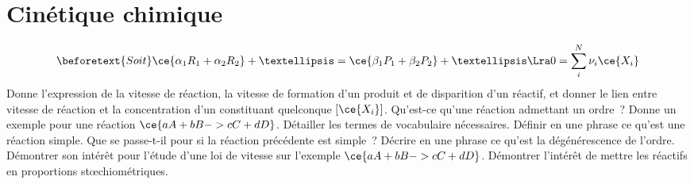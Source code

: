 \documentclass[a4paper, 10pt, final, garamond]{book}
\begin{document}
\setcounter{chapter}{7}

\chapter{Cinétique chimique }

\begin{enumerate}[label=\sqenumi, leftmargin=10pt]
	\leavevmode\vspace*{-\dimexpr\baselineskip+\abovedisplayskip\relax-10pt}
	\begin{gather*}
		\beforetext{Soit}
		\ce{\alpha_1R_1 + \alpha_2R_2} +…
		=
		\ce{\beta_1P_1 +\beta_2P_2}+…
		\Lra
		0 = \sum_{i}^{N}\nu_i \ce{X_i}
	\end{gather*}
	Donne l'expression de la vitesse de réaction, la vitesse de formation d'un
	produit et de disparition d'un réactif, et donner le lien entre vitesse de
	réaction et la concentration d'un constituant quelconque $[\ce{X_i}]$.
	\smallbreak
	\vspace{-15pt}
	Qu'est-ce qu'une réaction admettant un ordre~? Donne un exemple pour une
	réaction $\ce{aA + bB -> cC + dD}$. Détailler les termes de vocabulaire
	nécessaires. Définir en une phrase ce qu'est une réaction simple. Que se
	passe-t-il pour si la réaction précédente est simple~?
	\smallbreak
	Décrire en une phrase ce qu'est la dégénérescence de l'ordre. Démontrer son
	intérêt pour l'étude d'une loi de vitesse sur l'exemple $\ce{aA + bB -> cC +
			dD}$. Démontrer l'intérêt de mettre les réactifs en proportions
	stœchiométriques.
	\smallbreak
\end{enumerate}
\end{document}
